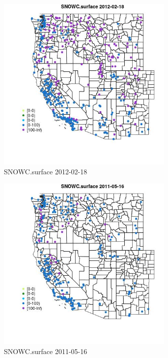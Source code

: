 \begin{figure} 
\centering  
\includegraphics[width=0.77\textwidth]{Code_Outputs/Report_ML_input_PM25_Step4_part_f_de_duplicated_aveswNAs_MapObsSNOWCsurface2012-02-18.jpg} 
\caption{\label{fig:Report_ML_input_PM25_Step4_part_f_de_duplicated_aveswNAsMapObsSNOWCsurface2012-02-18}SNOWC.surface 2012-02-18} 
\end{figure} 
 

\clearpage 

\begin{figure} 
\centering  
\includegraphics[width=0.77\textwidth]{Code_Outputs/Report_ML_input_PM25_Step4_part_f_de_duplicated_aveswNAs_MapObsSNOWCsurface2011-05-16.jpg} 
\caption{\label{fig:Report_ML_input_PM25_Step4_part_f_de_duplicated_aveswNAsMapObsSNOWCsurface2011-05-16}SNOWC.surface 2011-05-16} 
\end{figure} 
 

